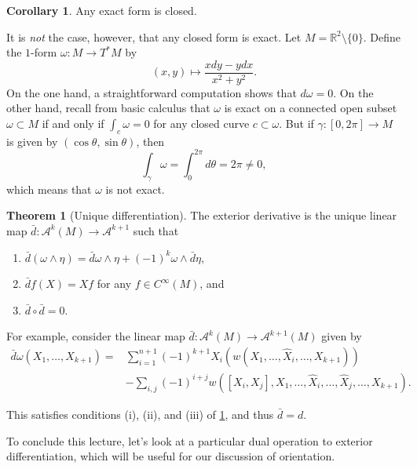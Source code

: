 \documentclass[10pt,letterpaper,cm]{nupset}
\theoremstyle{definition}
\theoremstyle{theorem}
\newtheorem{theorem}[definition]{Theorem}
\newtheorem{corollary}[definition]{Corollary}
\theoremstyle{remark}
\newcommand{\R}{\mathbb R}
\newcommand{\1}{\mathbf{1}}
\newcommand{\0}{\vec 0}
\begin{document}
\begin{corollary}
Any exact form is closed.
\end{corollary}

\smallskip


It is \emph{not} the case, however, that any closed form is exact. Let $M=  \R^2 \setminus \{0\}$. Define the $1$-form $\omega : M \to T^{\ast}M$ by $$\left(x, y\right) \mapsto \frac{xdy - y dx}{x^2 + y^2}.$$ On the one hand, a straightforward computation shows that $d \omega =0$. On the other hand, recall from basic calculus that $\omega$ is exact on a connected open subset $\omega \subset M$ if and only if $\int_c \omega =0$ for any closed curve $c \subset \omega$. But if $\gamma : [0, 2\pi] \to M$ is given by $\left(\cos \theta, \sin \theta\right)$, then  
\[\label{eqn:nexact}
 \int_{\gamma} \omega = \int_{0}^{2\pi} d\theta = 2\pi \ne 0 , \tag{$\dagger$}
\] which means that $\omega$ is not exact.


\begin{theorem}[Unique differentiation]\label{UD}
The exterior derivative is the unique linear map $\bar{d} : \mathcal{A}^k(M) \to \mathcal{A}^{k+1}$ such that
\begin{enumerate}[label=(\roman*)]
\item $\bar{d}( \omega \wedge \eta) = \bar{d} \omega \wedge \eta + ({-1})^k\omega \wedge \bar{d} \eta$,
\item $\bar{d}{f}(X)= X{f}$ for any $f\in C^{\infty}(M)$, and 
\item $\bar{d} \circ \bar{d} = 0$.
\end{enumerate}
\end{theorem}

\medskip

For example, consider the linear map $\bar{d} : \mathcal{A}^k(M) \to \mathcal{A}^{k+1}(M)$ given by  
\begin{align*} 
\bar{d}{\omega}\left(X_1, \ldots, X_{k+1}\right)  = 
&\sum_{i=1}^{n+1}(-1)^{k+1} X_{i}\left(w\left(X_{1}, \ldots, \widehat{X}_{i}, \ldots, X_{k+1}\right)\right)\\
&-\sum_{i, j}(-1)^{i+j} w\left(\left[X_{i}, X_{j}\right], X_{1}, \ldots, \widehat{X}_{i}, \ldots, \widehat{X}_{j}, \ldots, X_{k+1}\right).
\end{align*}

This satisfies conditions (i), (ii), and (iii) of \cref{UD}, and thus $\bar{d} = d$.


\bigskip

To conclude this lecture, let's look at a particular dual operation to exterior differentiation, which will be useful for our discussion of orientation. 
\end{document}
